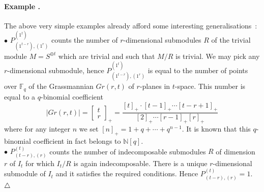 \documentclass[a4paper,10pt]{amsart}
\def\endexample{$\hfill \triangle$}
\def\N{\mathbb{N}}
\numberwithin{equation}{section}
\begin{document}
\paragraph{\textbf{Example \thetheo.}} The above very simple examples already afford some interesting generalisations~:\\
$\bullet$ $P^{(1^t)}_{(1^{t-r}),(1^r)}$ counts the number of $r$-dimensional submodules $R$ of the trivial module $M=S^{\oplus t}$ which are trivial and such that $M/R$ is trivial. We may pick any $r$-dimensional submodule, hence
$P^{(1^t)}_{(1^{t-r}),(1^r)}$ is equal to the number of points over $\mathbb{F}_q$ of the Grassmannian $Gr(r,t)$ of $r$-planes in $t$-space. This number is equal to a $q$-binomial coefficient
$$|Gr(r,t)|=\begin{bmatrix} t\\ r \end{bmatrix}_+=\frac{[t]_+ \cdot [t-1]_+ \cdots [t-r+1]_+}{[2]_+ \cdots [r-1]_+[r]_+} $$
where for any integer $n$ we set $[n]_+=1+q+ \cdots + q^{n-1}$. It is known that this $q$-binomial coefficient in fact belongs to $\N[q]$.\\
$\bullet$ $P^{(t)}_{(t-r),(r)}$ counts the number of indecomposable submodules $R$ of dimension $r$ of $I_t$  for which $I_t/R$ is again indecomposable. There is a unique $r$-dimensional submodule of $I_t$ and it satisfies the required conditions. Hence $P^{(t)}_{(t-r),(r)}=1$.
\endexample

\vspace{.15in}

\addtocounter{theo}{1}
\end{document}
